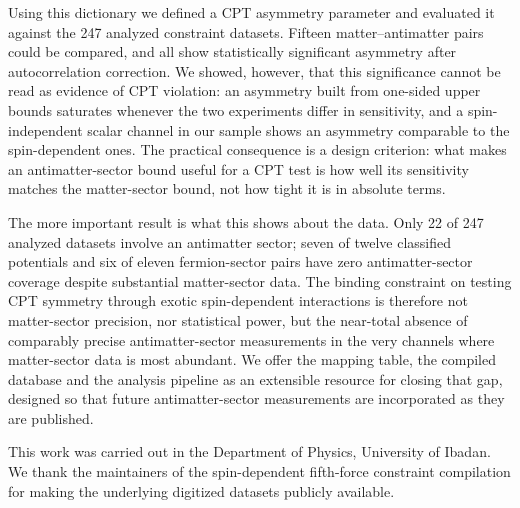 \documentclass[
  aps,
  prd,
  reprint,
  amsmath,
  amssymb,
  nofootinbib,
  superscriptaddress,
  floatfix
]{revtex4-2}
\begin{document}
Using this dictionary we defined a CPT asymmetry parameter and evaluated
it against the 247 analyzed constraint datasets. Fifteen
matter--antimatter pairs could be compared, and all show
statistically significant asymmetry after autocorrelation correction. We
showed, however, that this significance cannot be read as evidence of CPT
violation: an asymmetry built from one-sided upper bounds saturates
whenever the two experiments differ in sensitivity, and a spin-independent
scalar channel in our sample shows an asymmetry comparable to the
spin-dependent ones. The practical consequence is a design criterion: what
makes an antimatter-sector bound useful for a CPT test is how well its
sensitivity matches the matter-sector bound, not how tight it is in
absolute terms.

The more important result is what this shows about the data. Only 22 of 247
analyzed datasets involve an antimatter sector; seven of twelve classified
potentials and six of eleven fermion-sector pairs have zero
antimatter-sector coverage despite substantial matter-sector data. The
binding constraint on testing CPT symmetry through exotic spin-dependent
interactions is therefore not matter-sector precision, nor statistical
power, but the near-total absence of comparably precise antimatter-sector
measurements in the very channels where matter-sector data is most
abundant. We offer the mapping table, the compiled database and the
analysis pipeline as an extensible resource for closing that gap, designed
so that future antimatter-sector measurements are incorporated as they are
published.

\begin{acknowledgments}
This work was carried out in the Department of Physics, University of
Ibadan. We thank the maintainers of the spin-dependent fifth-force
constraint compilation for making the underlying digitized datasets
publicly available.
\end{acknowledgments}
\end{document}
